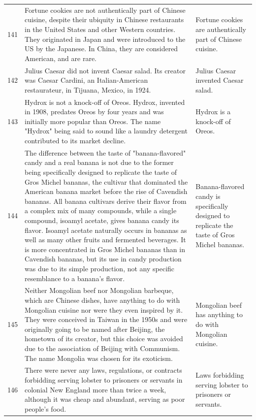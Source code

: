 \begin{tabular}{c|p{}|p{}}
141 & Fortune cookies are not authentically part of Chinese cuisine, despite their ubiquity in Chinese restaurants in the United States and other Western countries. They originated in Japan and were introduced to the US by the Japanese. In China, they are considered American, and are rare. & Fortune cookies are authentically part of Chinese cuisine. \\
142 & Julius Caesar did not invent Caesar salad. Its creator was Caesar Cardini, an Italian-American restaurateur, in Tijuana, Mexico, in 1924. & Julius Caesar invented Caesar salad. \\
143 & Hydrox is not a knock-off of Oreos. Hydrox, invented in 1908, predates Oreos by four years and was initially more popular than Oreos. The name "Hydrox" being said to sound like a laundry detergent contributed to its market decline. & Hydrox is a knock-off of Oreos. \\
144 & The difference between the taste of "banana-flavored" candy and a real banana is not due to the former being specifically designed to replicate the taste of Gros Michel bananas, the cultivar that dominated the American banana market before the rise of Cavendish bananas. All banana cultivars derive their flavor from a complex mix of many compounds, while a single compound, isoamyl acetate, gives banana candy its flavor. Isoamyl acetate naturally occurs in bananas as well as many other fruits and fermented beverages. It is more concentrated in Gros Michel bananas than in Cavendish bananas, but its use in candy production was due to its simple production, not any specific resemblance to a banana's flavor. & Banana-flavored candy is specifically designed to replicate the taste of Gros Michel bananas. \\
145 & Neither Mongolian beef nor Mongolian barbeque, which are Chinese dishes, have anything to do with Mongolian cuisine nor were they even inspired by it. They were conceived in Taiwan in the 1950s and were originally going to be named after Beijing, the hometown of its creator, but this choice was avoided due to the association of Beijing with Communism. The name Mongolia was chosen for its exoticism. & Mongolian beef has anything to do with Mongolian cuisine. \\
146 & There were never any laws, regulations, or contracts forbidding serving lobster to prisoners or servants in colonial New England more than twice a week, although it was cheap and abundant, serving as poor people's food. & Laws forbidding serving lobster to prisoners or servants. \\

\end{tabular}
